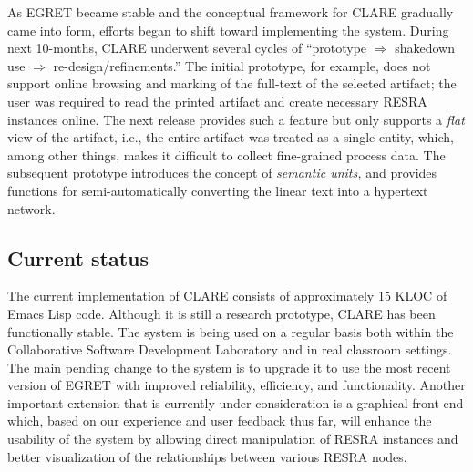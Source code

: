 As EGRET became stable and the conceptual framework for CLARE gradually
came into form, efforts began to shift toward implementing the system.
During next 10-months, CLARE underwent several cycles of ``prototype \(
{\Rightarrow} \) shakedown use \( {\Rightarrow} \) re-design/refinements.''
The initial prototype, for example, does not support online browsing and
marking of the full-text of the selected artifact; the user was required to
read the printed artifact and create necessary RESRA instances online. The
next release provides such a feature but only supports a {\it flat\/} view
of the artifact, i.e., the entire artifact was treated as a single entity,
which, among other things, makes it difficult to collect fine-grained
process data. The subsequent prototype introduces the concept of {\it semantic
units,\/} and provides functions for semi-automatically converting the
linear text into a hypertext network.


\subsection{Current status}
\label{sec:status}

The current implementation of CLARE consists of approximately 15 KLOC of
Emacs Lisp code. Although it is still a research prototype, CLARE has been
functionally stable. The system is being used on a regular basis both
within the Collaborative Software Development Laboratory and in real
classroom settings. The main pending change to the system is to upgrade it
to use the most recent version of EGRET with improved reliability,
efficiency, and functionality. Another important extension that is
currently under consideration is a graphical front-end which, based on our
experience and user feedback thus far, will enhance the usability of the
system by allowing direct manipulation of RESRA instances and better
visualization of the relationships between various RESRA nodes.








